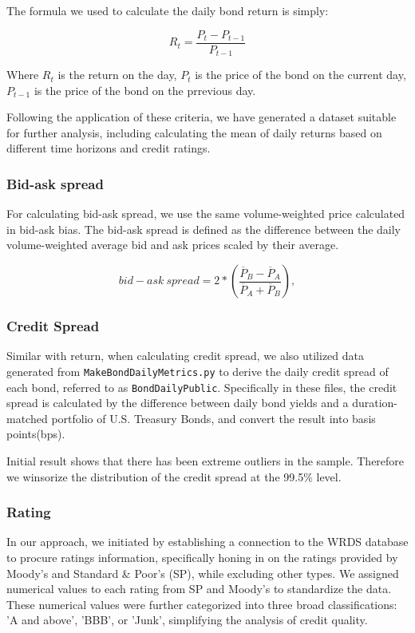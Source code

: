\documentclass[12pt]{article}
\begin{document}
The formula we used to calculate the daily bond return is simply:

\begin{equation}
R_t = \frac{P_t - P_{t-1}}{P_{t-1}}
\end{equation}

Where $R_t$ is the return on the day, $P_t$ is the price of the bond on the current day, $P_{t-1}$ is the price of the bond on the prrevious day.

Following the application of these criteria, we have generated a dataset suitable for further analysis, including calculating the mean of daily returns based on different time horizons and credit ratings. 


\subsubsection{Bid-ask spread}
For calculating bid-ask spread, we use the same volume-weighted price calculated in bid-ask bias. The bid-ask spread is defined as the difference
between the daily volume-weighted average bid and ask prices scaled by their average.

\begin{equation}
bid-ask\ spread = 2*\left(\frac{\overline{P}_B - \overline{P}_A}{\overline{P}_A + \overline{P}_B} \right),
\end{equation}


\subsubsection{Credit Spread}

Similar with return, when calculating credit spread, we also utilized data generated from \texttt{MakeBondDailyMetrics.py} to derive the daily credit spread of each bond, referred to as \texttt{BondDailyPublic}. Specifically in these files, the credit spread is calculated by the difference between daily bond yields and a duration-matched portfolio of U.S. Treasury Bonds, and convert the result into basis points(bps).

Initial result shows that there has been extreme outliers in the sample. Therefore we winsorize the distribution of the credit spread at the 99.5\% level.

\subsubsection{Rating}

In our approach, we initiated by establishing a connection to the WRDS database to procure ratings information, specifically honing in on the ratings provided by Moody's and Standard \& Poor's (SP), while excluding other types. We assigned numerical values to each rating from SP and Moody's to standardize the data. These numerical values were further categorized into three broad classifications: 'A and above', 'BBB', or 'Junk', simplifying the analysis of credit quality.
\end{document}
